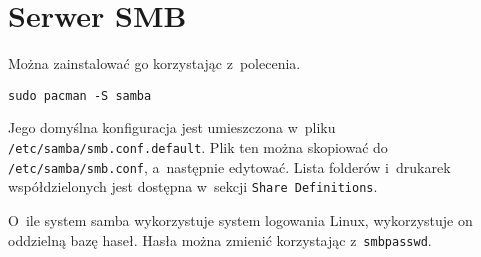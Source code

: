 \documentclass[a4paper,11pt]{article}
\begin{document}
\section{Serwer SMB}

Można zainstalować go korzystając z~polecenia.

\begin{verbatim}
sudo pacman -S samba
\end{verbatim}

Jego domyślna konfiguracja jest umieszczona w~pliku \verb|/etc/samba/smb.conf.default|. Plik
ten można skopiować do \verb|/etc/samba/smb.conf|, a~następnie edytować. Lista folderów
i~drukarek współdzielonych jest dostępna w~sekcji \verb|Share Definitions|.

O~ile system samba wykorzystuje system logowania Linux, wykorzystuje on oddzielną bazę haseł.
Hasła można zmienić korzystając z~\verb|smbpasswd|.
\end{document}
